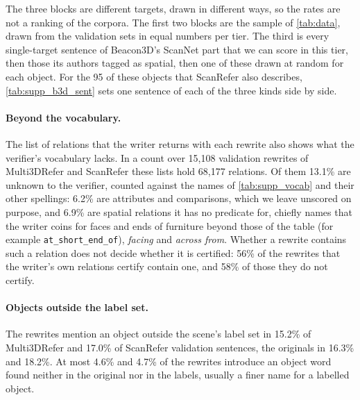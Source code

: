 The three blocks are different targets, drawn in different ways, so the rates are not a ranking of the corpora.
The first two blocks are the sample of \cref{tab:data}, drawn from the validation sets in equal numbers per tier.
The third is every single-target sentence of Beacon3D's ScanNet part that we can score in this tier, then those its authors tagged as spatial, then one of these drawn at random for each object.
For the 95 of these objects that ScanRefer also describes, \cref{tab:supp_b3d_sent} sets one sentence of each of the three kinds side by side.


\paragraph{Beyond the vocabulary.}
The list of relations that the writer returns with each rewrite also shows what the verifier's vocabulary lacks.
In a count over 15,108 validation rewrites of Multi3DRefer and ScanRefer these lists hold 68,177 relations.
Of them 13.1\% are unknown to the verifier, counted against the names of \cref{tab:supp_vocab} and their other spellings: 6.2\% are attributes and comparisons, which we leave unscored on purpose, and 6.9\% are spatial relations it has no predicate for, chiefly names that the writer coins for faces and ends of furniture beyond those of the table (for example \texttt{at\_short\_end\_of}), \emph{facing} and \emph{across from}.
Whether a rewrite contains such a relation does not decide whether it is certified: 56\% of the rewrites that the writer's own relations certify contain one, and 58\% of those they do not certify.

\paragraph{Objects outside the label set.}
The rewrites mention an object outside the scene's label set in 15.2\% of Multi3DRefer and 17.0\% of ScanRefer validation sentences, the originals in 16.3\% and 18.2\%.
At most 4.6\% and 4.7\% of the rewrites introduce an object word found neither in the original nor in the labels, usually a finer name for a labelled object.

